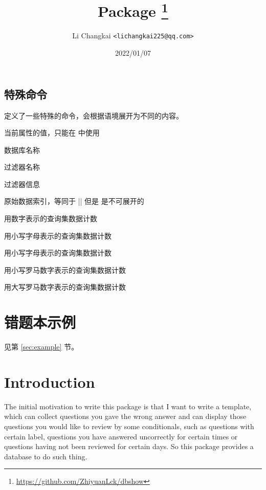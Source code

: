 \documentclass[full]{l3doc}
\begin{document}
\begin{documentation}
\subsection{特殊命令}

 定义了一些特殊的命令，会根据语境展开为不同的内容。

\DescribeMacro{\dbval}当前属性的值，只能在  中使用

\DescribeMacro{\dbDatabase}数据库名称

\DescribeMacro{\dbFilterName}过滤器名称

\DescribeMacro{\dbFilterInfo}过滤器信息

\DescribeMacro{\dbIndex}原始数据索引，等同于 || 但是  是不可展开的

\DescribeMacro{\dbarabic}用数字表示的查询集数据计数

\DescribeMacro{\dbalph}用小写字母表示的查询集数据计数

\DescribeMacro{\dbAlph}用小写字母表示的查询集数据计数

\DescribeMacro{\dbroman}用小写罗马数字表示的查询集数据计数

\DescribeMacro{\dbRoman}用大写罗马数字表示的查询集数据计数

\section{错题本示例}
见第 \ref{sec:example} 节。

\title{
  Package 
  \protect\footnote{\url{https://github.com/ZhiyuanLck/dbshow}}
}
\author{Li Changkai \texttt{<lichangkai225@qq.com>}}
\date{2022/01/07}
\maketitle

\section{Introduction}

The initial motivation to write this package is that I want to write a
template, which can collect questions you gave the wrong answer and can
display those questions you would like to review by some conditionals, such as
questions with certain label, questions you have answered uncorrectly for
certain times or questions having not been reviewed for certain days. So this
package provides a database to do such thing.


\end{documentation}
\end{document}
